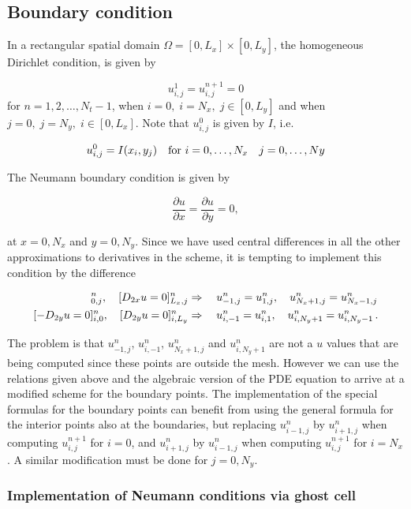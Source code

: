 \documentclass[letterpaper,10pt,english]{/usr/share/sphinx/texinputs/sphinxhowto}
\begin{document}
\subsection{Boundary condition}

In a rectangular spatial domain $\Omega = [0,L_x]\times [0,L_y]$, the
homogeneous Dirichlet condition, is given by

\[
u_{i,j}^{1} = u_{i,j}^{n+1} = 0 
\] for $n=1,2,\ldots,N_t-1$, when $i=0, \; i=N_x,\; j \in [0,L_y]$ and
when $j=0,\; j=N_y,\; i \in [0,L_x]$. Note that $u_{i,j}^{0}$ is given
by $I$, i.e.

\[
u_{i,j}^{0} = I(x_i,y_j) \quad \hbox{for   } i=0,\ldots,N_x \quad j=0,\ldots,Ny
\]

The Neumann boundary condition is given by

\begin{equation}
 \frac{\partial u}{\partial x}= \frac{\partial u}{\partial y} = 0,
\end{equation}

at $x = 0, N_x$ and $y = 0, N_y$. Since we have used central differences
in all the other approximations to derivatives in the scheme, it is
tempting to implement this condition by the difference

\begin{align*}
[-D_{2x} u = 0]^n_{0,j},\quad[D_{2x} u = 0]^n_{L_x,j}
&\Rightarrow\quad u^n_{-1,j}=u^n_{1,j}, \quad u^n_{N_x+1,j}=u^n_{N_x-1,j} \\
[-D_{2y} u = 0]^n_{i,0},\quad[D_{2y} u = 0]^n_{i,L_y}
&\Rightarrow\quad u^n_{i,-1}=u^n_{i,1}, \quad u^n_{i,N_y+1}=u^n_{i,N_y-1}
\thinspace .
\end{align*}

The problem is that $u^n_{-1,j}$, $u^n_{i,-1}$, $u^n_{N_x+1,j}$ and
$u^n_{i,N_y+1}$ are not a $u$ values that are being computed since these
points are outside the mesh. However we can use the relations given
above and the algebraic version of the PDE equation to arrive at a
modified scheme for the boundary points. The implementation of the
special formulas for the boundary points can benefit from using the
general formula for the interior points also at the boundaries, but
replacing $u_{i-1,j}^n$ by $u_{i+1,j}^n$ when computing $u_{i,j}^{n+1}$
for $i=0$, and $u_{i+1,j}^n$ by $u_{i-1,j}^n$ when computing
$u_{i,j}^{n+1}$ for $i=N_x$. A similar modification must be done for
$j=0,N_y$.\subsubsection{Implementation of Neumann conditions via ghost cell}
\end{document}
